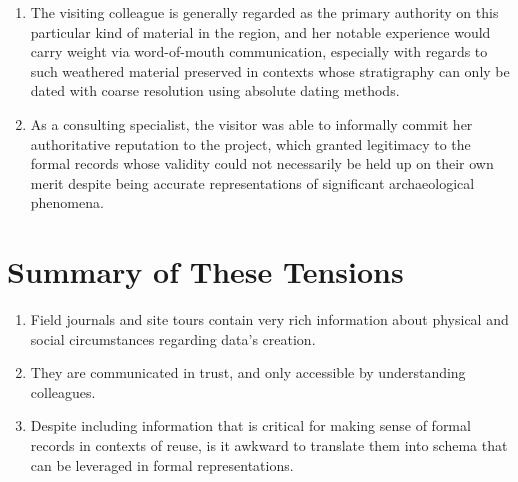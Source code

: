 \documentclass{article}
\begin{document}
\begin{enumerate}
  \item The visiting colleague is generally regarded as the primary authority on this particular kind of material in the region, and her notable experience would carry weight via word-of-mouth communication, especially with regards to such weathered material preserved in contexts whose stratigraphy can only be dated with coarse resolution using absolute dating methods.
  \item As a consulting specialist, the visitor was able to informally commit her authoritative reputation to the project, which granted legitimacy to the formal records whose validity could not necessarily be held up on their own merit despite being accurate representations of significant archaeological phenomena.
\end{enumerate}

\section{Summary of These Tensions}
\begin{enumerate}
  \item Field journals and site tours contain very rich information about physical and social circumstances regarding data’s creation.
  \item They are communicated in trust, and only accessible by understanding colleagues.
  \item Despite including information that is critical for making sense of formal records in contexts of reuse, is it awkward to translate them into schema that can be leveraged in formal representations.
\end{enumerate}
\end{document}
